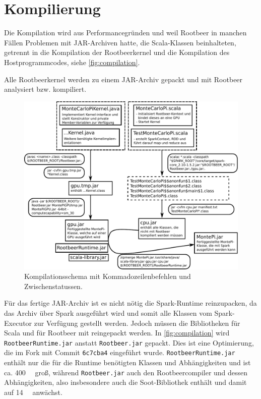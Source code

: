 \section{Kompilierung}

Die Kompilation wird aus Performancegründen und weil Rootbeer in manchen Fällen Problemen mit JAR-Archiven hatte, die Scala-Klassen beinhalteten, getrennt in die Kompilation der Rootbeerkernel und die Kompilation des Hostprogrammcodes, siehe \autoref{fig:compilation}.

Alle Rootbeerkernel werden zu einem JAR-Archiv gepackt und mit Rootbeer analysiert bzw. kompiliert.

\begin{figure}[H]
    \centering
    \begin{minipage}{\linewidth}
        \includegraphics[width=\linewidth]{compile-structure-deu-new.pdf}
    \end{minipage}
    \caption{Kompilationsschema mit Kommadozeilenbefehlen und Zwischenstatussen.}
    \label{fig:compilation}
\end{figure}

Für das fertige JAR-Archiv ist es nicht nötig die Spark-Runtime reinzupacken, da das Archiv über Spark ausgeführt wird und somit alle Klassen vom Spark-Executor zur Verfügung gestellt werden.
Jedoch müssen die Bibliotheken für Scala und für Rootbeer mit reingepackt werden.
In \autoref{fig:compilation} wird \lstinline!RootbeerRuntime.jar! anstatt \lstinline!Rootbeer.jar! gepackt.
Dies ist eine Optimierung, die im Fork \cite{ownrootbeerfork} mit Commit \lstinline!6c7cba4! eingeführt wurde.
\lstinline!RootbeerRuntime.jar! enthält nur die für die Runtime benötigten Klassen und Abhängigkeiten und ist ca. \SI{400}{\kilo\byte} groß, während \lstinline!Rootbeer.jar! auch den Rootbeercompiler und dessen Abhängigkeiten, also insbesondere auch die Soot-Bibliothek enthält und damit auf \SI{14}{\mega\byte} anwächst.
